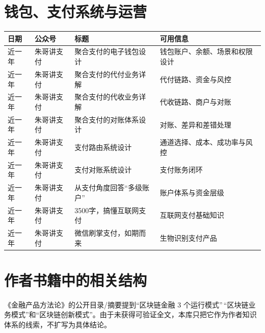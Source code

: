 \section{钱包、支付系统与运营}\label{ux94b1ux5305ux652fux4ed8ux7cfbux7edfux4e0eux8fd0ux8425}

{\def\LTcaptype{none} %
\begin{longtable}[]{@{}>{\raggedright\arraybackslash}p{1.9cm}>{\raggedright\arraybackslash}p{2.8cm}>{\raggedright\arraybackslash}p{6.0cm}>{\raggedright\arraybackslash}p{4.7cm}@{}}
\toprule\noalign{}
日期 & 公众号 & 标题 & 可用信息 \\
\midrule\noalign{}
\endhead
\bottomrule\noalign{}
\endlastfoot
近一年 & 朱哥讲支付 & 聚合支付的电子钱包设计 & 钱包账户、余额、场景和权限设计 \\
近一年 & 朱哥讲支付 & 聚合支付的代付业务详解 & 代付链路、资金与风控 \\
近一年 & 朱哥讲支付 & 聚合支付的代收业务详解 & 代收链路、商户与对账 \\
近一年 & 朱哥讲支付 & 聚合支付的对账体系设计 & 对账、差异和差错处理 \\
近一年 & 朱哥讲支付 & 支付路由系统设计 & 通道选择、成本、成功率与风控 \\
近一年 & 朱哥讲支付 & 支付对账系统设计 & 支付账务闭环 \\
近一年 & 朱哥讲支付 & 从支付角度回答``多级账户'' & 账户体系与资金层级 \\
近一年 & 朱哥讲支付 & 3500字，搞懂互联网支付 & 互联网支付基础知识 \\
近一年 & 朱哥讲支付 & 微信刷掌支付，如期而来 & 生物识别支付产品 \\
\end{longtable}
}

\section{作者书籍中的相关结构}\label{ux4f5cux8005ux4e66ux7c4dux4e2dux7684ux76f8ux5173ux7ed3ux6784}

《金融产品方法论》的公开目录/摘要提到``区块链金融 3
个运行模式''\,``区块链业务模式''和``区块链创新模式''。由于未获得可验证全文，本库只把它作为作者知识体系的线索，不扩写为具体结论。
